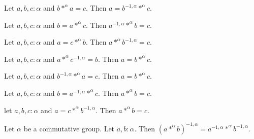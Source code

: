 \documentclass{article}
\begin{document}
\begin{forthel}
\begin{lemma} Let $a,b,c : \alpha$ and 
$b *^{\alpha} a = c$. Then $a = b^{-1,\alpha} *^{\alpha} c$.
\end{lemma}

\begin{lemma} Let $a,b,c : \alpha$ and
$b = a *^{\alpha} c$. Then $a^{-1,\alpha} *^{\alpha} b = c$.
\end{lemma}

\begin{lemma} Let $a,b,c : \alpha$ and 
$a = c *^{\alpha} b$. Then $a *^{\alpha} b^{-1,\alpha} = c$.
\end{lemma}

\begin{lemma} Let $a,b,c : \alpha$ and 
$a *^{\alpha} c^{-1,\alpha} = b$. Then $a = b *^{\alpha} c$.
\end{lemma}

\begin{lemma} Let $a,b,c : \alpha$ and 
$b^{-1,\alpha} *^{\alpha} a = c$. Then $a = b *^{\alpha} c$.
\end{lemma}

\begin{lemma} Let $a,b,c : \alpha$ and 
$b = a^{-1,\alpha} *^{\alpha} c$. Then $a *^{\alpha} b = c$.
\end{lemma}

\begin{lemma} let $a,b,c : \alpha$ and
$a = c *^{\alpha} b^{-1,\alpha}$. Then $a *^{\alpha} b = c$.
\end{lemma}

\begin{lemma} Let $\alpha$ be a commutative group. 
Let $a,b : \alpha$. Then 
$(a *^{\alpha} b)^{-1,\alpha} = a^{-1,\alpha} *^{\alpha} b^{-1,\alpha}$.
\end{lemma}

\end{forthel}
\end{document}
